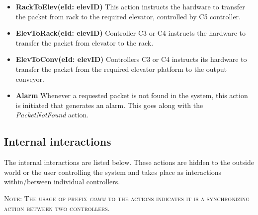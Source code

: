 \begin{itemize}
\item \textbf{RackToElev(eId: elevID)}
This action instructs the hardware to transfer the packet from rack to the required elevator, controlled by C5 controller.

\item \textbf{ElevToRack(eId: elevID)}
Controller C3 or C4 instructs the hardware to transfer the packet from elevator to the rack.

\item \textbf{ElevToConv(eId: elevID)}
Controllers C3 or C4 instructs its hardware to transfer the packet from the required elevator platform to the output conveyor.

\item \textbf{Alarm}
Whenever a requested packet is not found in the system, this action is initiated that generates an alarm. This goes along with the \textit{PacketNotFound} action.
\end{itemize}

\subsection*{Internal interactions}
The internal interactions are listed below. These actions are hidden to the outside world or the user controlling the system and takes place as interactions within/between individual controllers.

\textsc{Note: The usage of prefix \textit{comm} to the actions indicates it is a synchronizing action between two controllers.}

